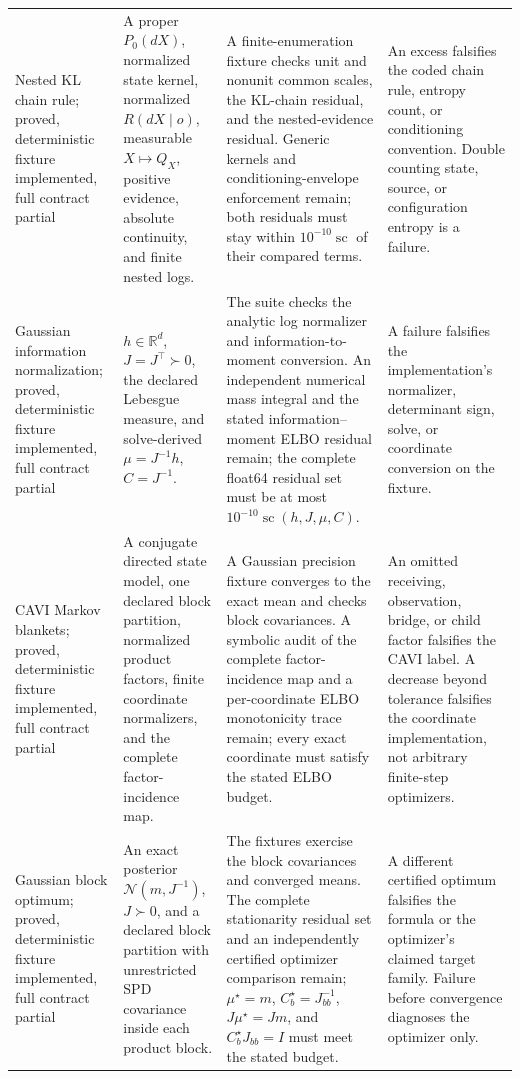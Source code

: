 \begin{longtable}{>{\raggedright\arraybackslash}p{}>{\raggedright\arraybackslash}p{}>{\raggedright\arraybackslash}p{}>{\raggedright\arraybackslash}p{}}
\addlinespace
Nested KL chain rule; proved, deterministic fixture implemented, full contract partial & A proper \(P_0(dX)\), normalized state kernel, normalized \(R(dX\mid o)\), measurable \(X\mapsto Q_X\), positive evidence, absolute continuity, and finite nested logs. & A finite-enumeration fixture checks unit and nonunit common scales, the KL-chain residual, and the nested-evidence residual. Generic kernels and conditioning-envelope enforcement remain; both residuals must stay within \(10^{-10}\operatorname{sc}\) of their compared terms. & An excess falsifies the coded chain rule, entropy count, or conditioning convention. Double counting state, source, or configuration entropy is a failure. \\
\addlinespace
Gaussian information normalization; proved, deterministic fixture implemented, full contract partial & \(h\in\mathbb R^d\), \(J=J^\top\succ0\), the declared Lebesgue measure, and solve-derived \(\mu=J^{-1}h\), \(C=J^{-1}\). & The suite checks the analytic log normalizer and information-to-moment conversion. An independent numerical mass integral and the stated information--moment ELBO residual remain; the complete float64 residual set must be at most \(10^{-10}\operatorname{sc}(h,J,\mu,C)\). & A failure falsifies the implementation's normalizer, determinant sign, solve, or coordinate conversion on the fixture. \\
\addlinespace
CAVI Markov blankets; proved, deterministic fixture implemented, full contract partial & A conjugate directed state model, one declared block partition, normalized product factors, finite coordinate normalizers, and the complete factor-incidence map. & A Gaussian precision fixture converges to the exact mean and checks block covariances. A symbolic audit of the complete factor-incidence map and a per-coordinate ELBO monotonicity trace remain; every exact coordinate must satisfy the stated ELBO budget. & An omitted receiving, observation, bridge, or child factor falsifies the CAVI label. A decrease beyond tolerance falsifies the coordinate implementation, not arbitrary finite-step optimizers. \\
\addlinespace
Gaussian block optimum; proved, deterministic fixture implemented, full contract partial & An exact posterior \(\mathcal N(m,J^{-1})\), \(J\succ0\), and a declared block partition with unrestricted SPD covariance inside each product block. & The fixtures exercise the block covariances and converged means. The complete stationarity residual set and an independently certified optimizer comparison remain; \(\mu^\star=m\), \(C_b^\star=J_{bb}^{-1}\), \(J\mu^\star=Jm\), and \(C_b^\star J_{bb}=I\) must meet the stated budget. & A different certified optimum falsifies the formula or the optimizer's claimed target family. Failure before convergence diagnoses the optimizer only. \\

\end{longtable}

